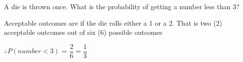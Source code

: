 

\question[1]  A die is thrown once. What is the probability of getting a number less than 3?

\ifprintanswers
\fi 

\begin{solution}[\mcq]
	Acceptable outcomes are if the die rolls either a 1 or a 2. That is two (2) acceptable 
	outcomes out of six (6) possible outcomes
	
	$\therefore P( number < 3 )$ = $\dfrac{2}{6} = \dfrac{1}{3}$
\end{solution}
